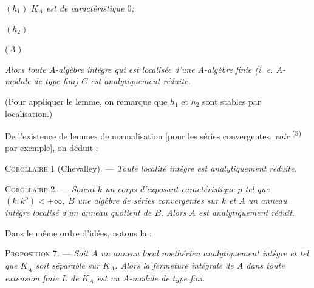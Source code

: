 $(h_1)$ \textit{$K_A$ est de caractéristique $0$;}

$(h_2)$ 


\begin{center}( 3 )\end{center}

\textit{Alors toute $A$-algèbre intègre qui est localisée d'une $A$-algèbre finie (i. e. $A$-module de type fini) $C$ est analytiquement réduite.}

(Pour appliquer le lemme, on remarque que $h_1$ et $h_2$ sont stables par localisation.)

De l'existence de lemmes de normalisation [pour les séries convergentes, \textit{voir} \textsuperscript{(5)} par exemple], on déduit :

\textsc{Corollaire 1} (Chevalley). --- \textit{Toute localité intègre est analytiquement réduite.}

\textsc{Corollaire 2.} --- \textit{Soient $k$ un corps d'exposant caractéristique $p$ tel que $(k:k^p)<+\infty$, $B$ une algèbre de séries convergentes sur $k$ et $A$ un anneau intègre localisé d'un anneau quotient de $B$. Alors $A$ est analytiquement réduit.}

Dans le même ordre d'idées, notons la :

\textsc{Proposition 7.} --- \textit{Soit $A$ un anneau local noethérien analytiquement intègre et tel que $K_{\widehat A}$ soit séparable sur $K_A$. Alors la fermeture intégrale de $A$ dans toute extension finie $L$ de $K_A$ est un $A$-module de type fini.}


